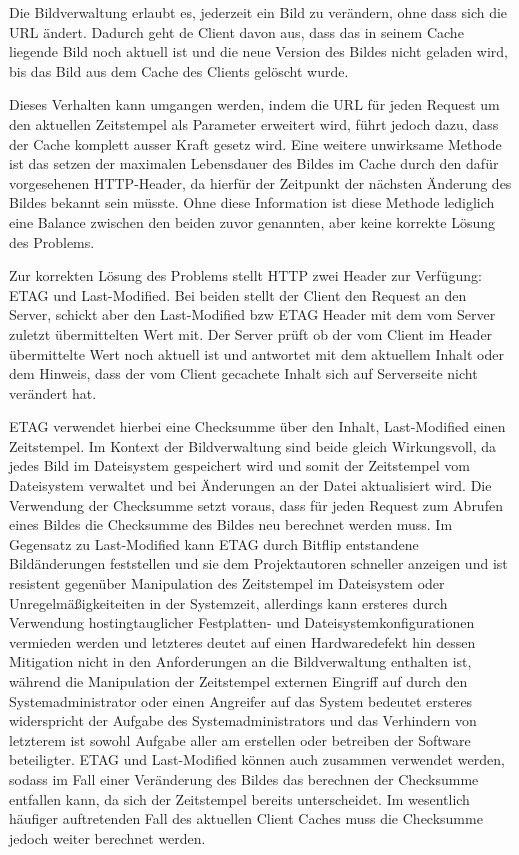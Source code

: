 Die Bildverwaltung erlaubt es, jederzeit ein Bild zu verändern, ohne dass sich
die URL ändert. Dadurch geht de Client davon aus, dass das in seinem Cache
liegende Bild noch aktuell ist und die neue Version des Bildes nicht geladen
wird, bis das Bild aus dem Cache des Clients gelöscht wurde.

Dieses Verhalten kann umgangen werden, indem die URL für jeden Request um den
aktuellen Zeitstempel als Parameter erweitert wird, führt jedoch dazu, dass der
Cache komplett ausser Kraft gesetz wird. Eine weitere unwirksame Methode ist das
setzen der maximalen Lebensdauer des Bildes im Cache durch den dafür
vorgesehenen HTTP-Header, da hierfür der Zeitpunkt der nächsten Änderung des
Bildes bekannt sein müsste. Ohne diese Information ist diese Methode lediglich
eine Balance zwischen den beiden zuvor genannten, aber keine korrekte Lösung des
Problems.

Zur korrekten Lösung des Problems stellt HTTP zwei Header zur Verfügung: ETAG
und Last-Modified. Bei beiden stellt der Client den Request an den Server,
schickt aber den Last-Modified bzw ETAG Header mit dem vom Server zuletzt
übermittelten Wert mit. Der Server prüft ob der vom Client im Header
übermittelte Wert noch aktuell ist und antwortet mit dem aktuellem Inhalt oder
dem Hinweis, dass der vom Client gecachete Inhalt sich auf Serverseite nicht
verändert hat.

ETAG verwendet hierbei eine Checksumme über den Inhalt, Last-Modified einen
Zeitstempel. Im Kontext der Bildverwaltung sind beide gleich Wirkungsvoll, da
jedes Bild im Dateisystem gespeichert wird und somit der Zeitstempel vom
Dateisystem verwaltet und bei Änderungen an der Datei aktualisiert wird. Die
Verwendung der Checksumme setzt voraus, dass für jeden Request zum Abrufen eines
Bildes die Checksumme des Bildes neu berechnet werden muss. Im Gegensatz zu
Last-Modified kann ETAG durch Bitflip entstandene Bildänderungen feststellen und
sie dem Projektautoren schneller anzeigen und ist resistent gegenüber
Manipulation des Zeitstempel im Dateisystem oder Unregelmäßigkeiteiten in der
Systemzeit, allerdings kann ersteres durch Verwendung hostingtauglicher
Festplatten- und Dateisystemkonfigurationen vermieden werden und letzteres
deutet auf einen Hardwaredefekt hin dessen Mitigation nicht in den Anforderungen
an die Bildverwaltung enthalten ist, während die Manipulation der Zeitstempel
externen Eingriff auf durch den Systemadministrator oder einen Angreifer auf das
System bedeutet ersteres widerspricht der Aufgabe des Systemadministrators und
das Verhindern von letzterem ist sowohl Aufgabe aller am erstellen oder
betreiben der Software beteiligter. ETAG und Last-Modified können auch zusammen
verwendet werden, sodass im Fall einer Veränderung des Bildes das berechnen der
Checksumme entfallen kann, da sich der Zeitstempel bereits unterscheidet. Im
wesentlich häufiger auftretenden Fall des aktuellen Client Caches muss die
Checksumme jedoch weiter berechnet werden.

